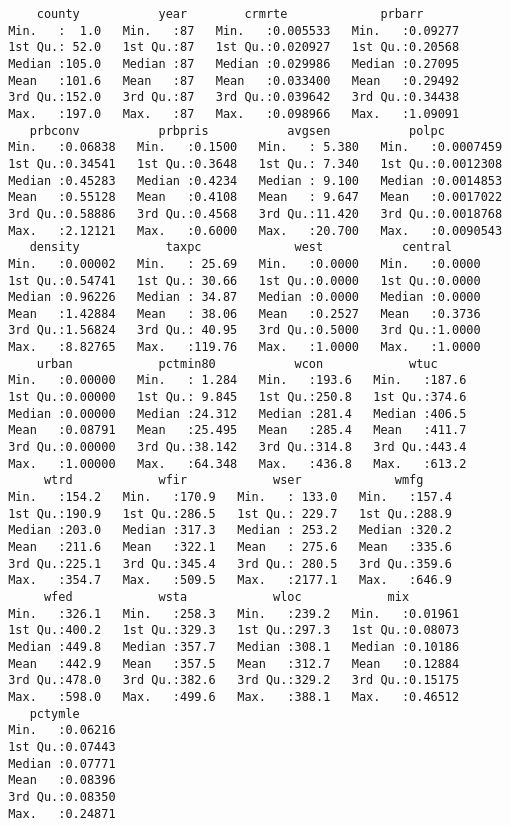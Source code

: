 \documentclass[11pt]{article}
\begin{document}
    
    \begin{verbatim}
     county           year        crmrte             prbarr       
 Min.   :  1.0   Min.   :87   Min.   :0.005533   Min.   :0.09277  
 1st Qu.: 52.0   1st Qu.:87   1st Qu.:0.020927   1st Qu.:0.20568  
 Median :105.0   Median :87   Median :0.029986   Median :0.27095  
 Mean   :101.6   Mean   :87   Mean   :0.033400   Mean   :0.29492  
 3rd Qu.:152.0   3rd Qu.:87   3rd Qu.:0.039642   3rd Qu.:0.34438  
 Max.   :197.0   Max.   :87   Max.   :0.098966   Max.   :1.09091  
    prbconv           prbpris           avgsen           polpc          
 Min.   :0.06838   Min.   :0.1500   Min.   : 5.380   Min.   :0.0007459  
 1st Qu.:0.34541   1st Qu.:0.3648   1st Qu.: 7.340   1st Qu.:0.0012308  
 Median :0.45283   Median :0.4234   Median : 9.100   Median :0.0014853  
 Mean   :0.55128   Mean   :0.4108   Mean   : 9.647   Mean   :0.0017022  
 3rd Qu.:0.58886   3rd Qu.:0.4568   3rd Qu.:11.420   3rd Qu.:0.0018768  
 Max.   :2.12121   Max.   :0.6000   Max.   :20.700   Max.   :0.0090543  
    density            taxpc             west           central      
 Min.   :0.00002   Min.   : 25.69   Min.   :0.0000   Min.   :0.0000  
 1st Qu.:0.54741   1st Qu.: 30.66   1st Qu.:0.0000   1st Qu.:0.0000  
 Median :0.96226   Median : 34.87   Median :0.0000   Median :0.0000  
 Mean   :1.42884   Mean   : 38.06   Mean   :0.2527   Mean   :0.3736  
 3rd Qu.:1.56824   3rd Qu.: 40.95   3rd Qu.:0.5000   3rd Qu.:1.0000  
 Max.   :8.82765   Max.   :119.76   Max.   :1.0000   Max.   :1.0000  
     urban            pctmin80           wcon            wtuc      
 Min.   :0.00000   Min.   : 1.284   Min.   :193.6   Min.   :187.6  
 1st Qu.:0.00000   1st Qu.: 9.845   1st Qu.:250.8   1st Qu.:374.6  
 Median :0.00000   Median :24.312   Median :281.4   Median :406.5  
 Mean   :0.08791   Mean   :25.495   Mean   :285.4   Mean   :411.7  
 3rd Qu.:0.00000   3rd Qu.:38.142   3rd Qu.:314.8   3rd Qu.:443.4  
 Max.   :1.00000   Max.   :64.348   Max.   :436.8   Max.   :613.2  
      wtrd            wfir            wser             wmfg      
 Min.   :154.2   Min.   :170.9   Min.   : 133.0   Min.   :157.4  
 1st Qu.:190.9   1st Qu.:286.5   1st Qu.: 229.7   1st Qu.:288.9  
 Median :203.0   Median :317.3   Median : 253.2   Median :320.2  
 Mean   :211.6   Mean   :322.1   Mean   : 275.6   Mean   :335.6  
 3rd Qu.:225.1   3rd Qu.:345.4   3rd Qu.: 280.5   3rd Qu.:359.6  
 Max.   :354.7   Max.   :509.5   Max.   :2177.1   Max.   :646.9  
      wfed            wsta            wloc            mix         
 Min.   :326.1   Min.   :258.3   Min.   :239.2   Min.   :0.01961  
 1st Qu.:400.2   1st Qu.:329.3   1st Qu.:297.3   1st Qu.:0.08073  
 Median :449.8   Median :357.7   Median :308.1   Median :0.10186  
 Mean   :442.9   Mean   :357.5   Mean   :312.7   Mean   :0.12884  
 3rd Qu.:478.0   3rd Qu.:382.6   3rd Qu.:329.2   3rd Qu.:0.15175  
 Max.   :598.0   Max.   :499.6   Max.   :388.1   Max.   :0.46512  
    pctymle       
 Min.   :0.06216  
 1st Qu.:0.07443  
 Median :0.07771  
 Mean   :0.08396  
 3rd Qu.:0.08350  
 Max.   :0.24871  
    \end{verbatim}
\end{document}
